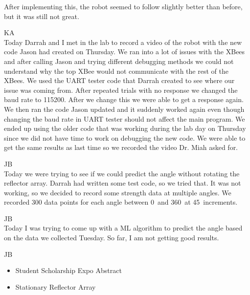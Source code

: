 \documentclass[fontsize=11pt, %
                             paper=letter, %
                             openany, %
                             captions=tableheading,
                             index=totoc,
                             hyperref]{labbook}
\begin{document}
\begin{addmargin}[0cm]{0cm}
\vspace{12pt}
After implementing this, the robot seemed to follow slightly better than before, but it was still not great.

KA\\
Today Darrah and I met in the lab to record a video of the robot with the new code Jason had created on Thursday. We ran into a lot of issues with the XBees and after calling Jason and trying different debugging methods we could not understand why the top XBee would not communicate with the rest of the XBees. We used the UART tester code that Darrah created to see where our issue was coming from. After repeated trials with no response we changed the baud rate to 115200. After we change this we were able to get a response again. We then ran the code Jason updated and it suddenly worked again even though changing the baud rate in UART tester should not affect the main program. We ended up using the older code that was working during the lab day on Thursday since we did not have time to work on debugging the new code. We were able to get the same results as last time so we recorded the video Dr. Miah asked for.

JB\\
Today we were trying to see if we could predict the angle without rotating the reflector array. Darrah had written some test code, so we tried that. It was not working, so we decided to record some strength data at multiple angles. We recorded 300 data points for each angle between 0\textdegree~and 360\textdegree~at 45\textdegree~increments.

JB\\
Today I was trying to come up with a ML algorithm to predict the angle based on the data we collected Tuesday. So far, I am not getting good results.

JB\\
\begin{itemize}
    \item Student Scholarship Expo Abstract
    \item Stationary Reflector Array
\end{itemize}


\end{addmargin}
\end{document}
